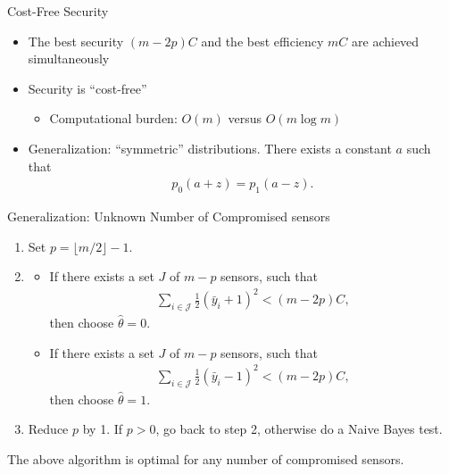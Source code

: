 \documentclass[10pt]{beamer}
\newcommand{\tikzdir}[1]{#1.tikz}
\newcommand{\inputtikz}[1]{}}
\begin{document}
\begin{frame}{Cost-Free Security}
  \begin{itemize}
  \item The best security $(m-2p)C$ and the best efficiency $mC$ are achieved simultaneously
  \item Security is ``cost-free''
    \begin{itemize}
    \item Computational burden: $O(m)$ versus $O(m\log m)$
    \end{itemize}
  \item Generalization: ``symmetric'' distributions. There exists a constant $a$ such that 
    \begin{align*}
      p_0(a+z) = p_1(a-z).
    \end{align*}
  \end{itemize}
\end{frame}

\begin{frame}{Generalization: Unknown Number of Compromised sensors}
  \begin{enumerate}
  \item Set $p = \lfloor m/2\rfloor -1$.
  \item 
    \begin{itemize}
    \item If there exists a set $J$ of $m-p$ sensors, such that
      \begin{align*}
        \sum_{i\in \mathcal J}\frac{1}{2}(\bar y_i+1)^2 < (m-2p)C,
      \end{align*}
      then choose $\hat \theta = 0$. 
    \item If there exists a set $J$ of $m-p$ sensors, such that
      \begin{align*}
        \sum_{i\in \mathcal J}\frac{1}{2}(\bar y_i-1)^2 < (m-2p)C,
      \end{align*}
      then choose $\hat \theta = 1$. 
    \end{itemize}
  \item Reduce $p$ by 1. If $p > 0$, go back to step 2, otherwise do a Naive Bayes test.
  \end{enumerate}
  The above algorithm is optimal for any number of compromised sensors.
\end{frame}

\end{document}
